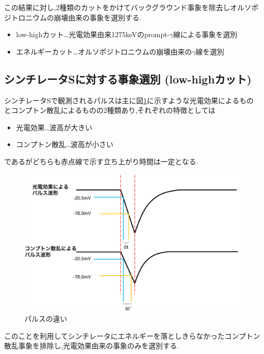 この結果に対し,2種類のカットをかけてバックグラウンド事象を除去しオルソポジトロニウムの崩壊由来の事象を選別する.
\begin{itemize}
	\item low-highカット…光電効果由来1275keVのprompt-$\gamma$線による事象を選別
	\item エネルギーカット…オルソポジトロニウムの崩壊由来の$\gamma$線を選別
\end{itemize}

\subsection{シンチレータSに対する事象選別 (low-highカット)}
シンチレータSで観測されるパルスは主に図\ref{fig:pulse_diff}に示すような光電効果によるものとコンプトン散乱によるものの2種類あり,それぞれの特徴としては
\begin{itemize}
	\item 光電効果…波高が大きい
	\item コンプトン散乱…波高が小さい
\end{itemize}
であるがどちらも赤点線で示す立ち上がり時間は一定となる.
\begin{figure}[htbp]
	\centering
		\includegraphics[width=15cm]{fig/isb/pulse_difference.pdf}
		\caption{パルスの違い}
		\label{fig:pulse_diff}
\end{figure}
このことを利用してシンチレータにエネルギーを落としきらなかったコンプトン散乱事象を排除し,光電効果由来の事象のみを選別する.

